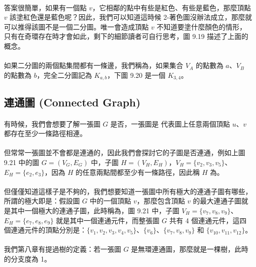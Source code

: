 \documentclass[12pt,a4paper,oneside]{report}
\begin{document}
\begin{CJK}{UTF8}{bkai}
\paragraph{}答案很簡單，如果有一個點 $v$，它相鄰的點中有些是紅色、有些是藍色，那麼頂點 $v$ 該塗紅色還是藍色呢？因此，我們可以知道這時候 2-著色圖沒辦法成立，那麼就可以推得該圖不是一個二分圖。唯一會造成頂點 $v$ 不知道要塗什麼顏色的情形，只有在奇環存在時才會如此，剩下的細節讀者可自行思考，圖 9.19 描述了上面的概念。
\paragraph{}如果二分圖的兩個點集間都有一條邊，我們稱為\textbf{}，如果集合 $V_A$ 的點數為 $a$、$V_B$ 的點數為 $b$，完全二分圖記為 $K_{a,b}$，下圖 9.20 是一個 $K_{3,4}$。

\subsection{連通圖 (Connected Graph)}
\paragraph{}有時候，我們會想要了解一張圖 $G$ 是否\textbf{}，一張圖是\textbf{} 代表圖上任意兩個頂點 $u$、$v$ 都存在至少一條路徑相連。
\paragraph{}但常常一張圖並不會都是連通的，因此我們會探討它的子圖是否連通，例如上圖 9.21 中的圖 $G=(V_G,E_G)$ 中，子圖 $H=(V_H,E_H)$，$V_H=\{{v_2,v_3,v_5}\}$、$E_H=\{{e_2,e_3}\}$，因為 $H$ 的任意兩點間都至少有一條路徑，因此稱 $H$ 為\textbf{}。
\paragraph{}但僅僅知道這樣子是不夠的，我們想要知道一張圖中所有極大的連通子圖有哪些，所謂的極大即是：假設圖 $G$ 中的一個頂點 $v$，那麼包含頂點 $v$ 的最大連通子圖就是其中一個極大的連通子圖，此時稱為\textbf{}，圖 9.21 中，子圖 $V_H=\{{v_7,v_8,v_9}\}$、$E_H=\{{e_7,e_8,e_9}\}$ 就是其中一個連通元件，而整張圖 $G$ 共有 4 個連通元件，這四個連通元件的頂點分別是：$\{v_1,v_2,v_3,v_4,v_5\}$、$\{v_6\}$、$\{v_7,v_8,v_9\}$ 和 $\{v_{10},v_{11},v_{12}\}$。
\paragraph{}我們第八章有提過樹的定義：若一張圖 $G$ 是無環連通圖，那麼就是一棵樹，此時 的分支度為 1。


\end{CJK}
\end{document}
